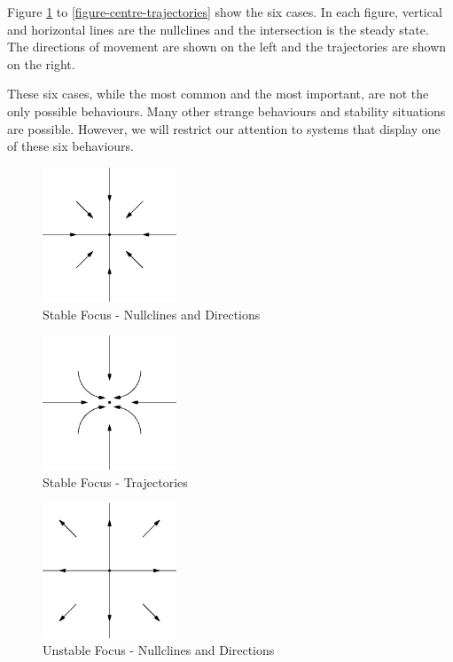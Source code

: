 \documentclass[fleqn,letterpaper]{report}
\begin{document}
Figure \ref{figure-stable-focus-nullclines} to
\ref{figure-centre-trajectories} show the six cases.
In each figure, vertical and horizontal lines are the
nullclines and the intersection is the steady state. The
directions of movement are shown on the left and the
trajectories are shown on the right.

These six cases, while the most common and the most important,
are not the only possible behaviours. Many other strange
behaviours and stability situations are possible. However, we
will restrict our attention to systems that display one of
these six behaviours.

\begin{figure}[t]
\centering
\includegraphics[width=4cm]{figure30.eps}
\caption{Stable Focus - Nullclines and Directions}
\label{figure-stable-focus-nullclines}
\end{figure}

\begin{figure}[t]
\centering
\includegraphics[width=4cm]{figure46.eps}
\caption{Stable Focus - Trajectories}
\label{figure-stable-focus-trajectories}
\end{figure}

\begin{figure}[t]
\centering
\includegraphics[width=4cm]{figure31.eps}
\caption{Unstable Focus - Nullclines and Directions}
\label{figure-unstable-focus-nullclines}
\end{figure}
\end{document}
